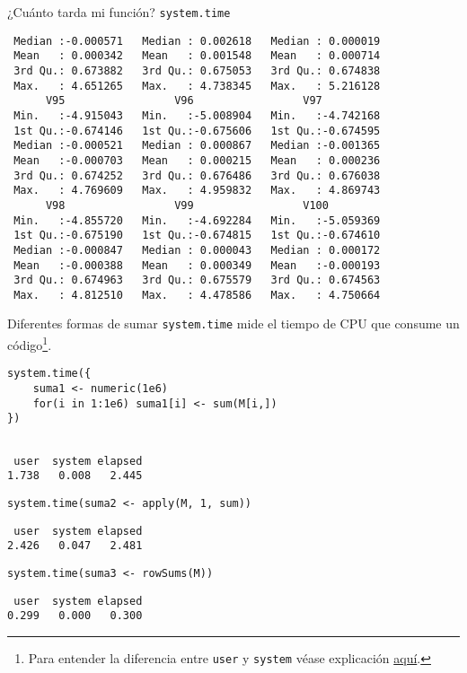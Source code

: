\documentclass[xcolor={usenames,svgnames,dvipsnames}]{beamer}
\begin{document}
\begin{frame}[label={sec:org4ea8038},fragile]{¿Cuánto tarda mi función? \texttt{system.time}}
\begin{verbatim}
 Median :-0.000571   Median : 0.002618   Median : 0.000019  
 Mean   : 0.000342   Mean   : 0.001548   Mean   : 0.000714  
 3rd Qu.: 0.673882   3rd Qu.: 0.675053   3rd Qu.: 0.674838  
 Max.   : 4.651265   Max.   : 4.738345   Max.   : 5.216128  
      V95                 V96                 V97           
 Min.   :-4.915043   Min.   :-5.008904   Min.   :-4.742168  
 1st Qu.:-0.674146   1st Qu.:-0.675606   1st Qu.:-0.674595  
 Median :-0.000521   Median : 0.000867   Median :-0.001365  
 Mean   :-0.000703   Mean   : 0.000215   Mean   : 0.000236  
 3rd Qu.: 0.674252   3rd Qu.: 0.676486   3rd Qu.: 0.676038  
 Max.   : 4.769609   Max.   : 4.959832   Max.   : 4.869743  
      V98                 V99                 V100          
 Min.   :-4.855720   Min.   :-4.692284   Min.   :-5.059369  
 1st Qu.:-0.675190   1st Qu.:-0.674815   1st Qu.:-0.674610  
 Median :-0.000847   Median : 0.000043   Median : 0.000172  
 Mean   :-0.000388   Mean   : 0.000349   Mean   :-0.000193  
 3rd Qu.: 0.674963   3rd Qu.: 0.675579   3rd Qu.: 0.674563  
 Max.   : 4.812510   Max.   : 4.478586   Max.   : 4.750664
\end{verbatim}
\end{frame}

\begin{frame}[label={sec:org4f3d3e4},fragile]{Diferentes formas de sumar}
 \texttt{system.time} mide el tiempo de CPU que consume un código\footnote{Para entender la diferencia entre \texttt{user} y \texttt{system} véase explicación \href{http://r.789695.n4.nabble.com/Meaning-of-proc-time-tp2303263p2306691.html}{aquí}.}.

\lstset{language=r,label= ,caption= ,captionpos=b,numbers=none}
\begin{lstlisting}
system.time({
    suma1 <- numeric(1e6)
    for(i in 1:1e6) suma1[i] <- sum(M[i,])
})
\end{lstlisting}

\begin{verbatim}

 user  system elapsed 
1.738   0.008   2.445
\end{verbatim}


\lstset{language=r,label= ,caption= ,captionpos=b,numbers=none}
\begin{lstlisting}
system.time(suma2 <- apply(M, 1, sum))
\end{lstlisting}

\begin{verbatim}
 user  system elapsed 
2.426   0.047   2.481
\end{verbatim}


\lstset{language=r,label= ,caption= ,captionpos=b,numbers=none}
\begin{lstlisting}
system.time(suma3 <- rowSums(M))
\end{lstlisting}

\begin{verbatim}
 user  system elapsed 
0.299   0.000   0.300
\end{verbatim}
\end{frame}
\end{document}

